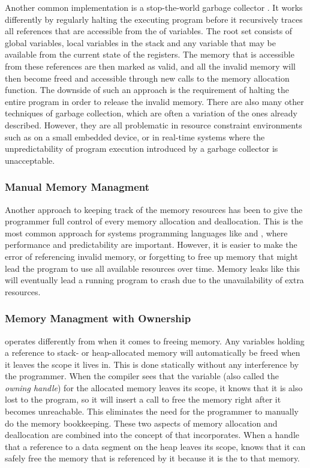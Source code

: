 Another common implementation is a stop-the-world garbage collector \cite{Wilson1992}.
It works differently by regularly halting the executing program before it recursively traces all references that are accessible from the  of variables.
The root set consists of global variables, local variables in the stack and any variable that may be available from the current state of the registers.
The memory that is accessible from these references are then marked as valid, and all the invalid memory will then become freed and accessible through new calls to the memory allocation function.
The downside of such an approach is the requirement of halting the entire program in order to release the invalid memory.
There are also many other techniques of garbage collection, which are often a variation of the ones already described.
However, they are all problematic in resource constraint environments such as on a small embedded device, or in real-time systems where the unpredictability of program execution introduced by a garbage collector is unacceptable.

\subsubsection{Manual Memory Managment}

Another approach to keeping track of the memory resources has been to give the programmer full control of every memory allocation and deallocation.
This is the most common approach for systems programming languages like {\C} and {\Cpp}, where performance and predictability are important.
However, it is easier to make the error of referencing invalid memory, or forgetting to free up memory that might lead the program to use all available resources over time.
Memory leaks like this will eventually lead a running program to crash due to the unavailability of extra resources.

\subsubsection{Memory Managment with Ownership}

{\rust} operates differently from {\C} when it comes to freeing memory.
Any variables holding a reference to stack- or heap-allocated memory will automatically be freed when it leaves the scope it lives in.
This is done statically without any interference by the programmer.
When the compiler sees that the variable (also called the \emph{owning handle}) for the allocated memory leaves its scope, it knows that it is also lost to the program, so it will insert a call to free the memory right after it becomes unreachable.
This eliminates the need for the programmer to manually do the memory bookkeeping.
These two aspects of memory allocation and deallocation are combined into the concept of  that {\rust} incorporates.
When a handle that  a reference to a data segment on the heap leaves its scope, {\rust} knows that it can safely free the memory that is referenced by it because it is the  to that memory.

